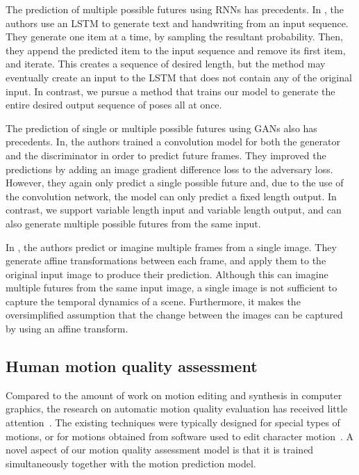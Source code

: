 \documentclass[10pt,twocolumn,letterpaper]{article}
\begin{document}
The prediction of multiple possible futures using RNNs has precedents. In \cite{corr2013:Graves}, the authors use an LSTM\cite{nc1997:Hochreiter} to generate text and handwriting from an input sequence. They generate one item at a time, by sampling the resultant probability. Then, they append the predicted item to the input sequence and remove its first item, and iterate. This creates a sequence of desired length, but the method may eventually create an input to the LSTM that does not contain any of the original input. In contrast, we pursue a method that trains our model to generate the entire desired output sequence of poses all at once.

The prediction of single or multiple possible futures using GANs also has precedents. In\cite{corr2015:Mathieu}, the authors trained a convolution model for both the generator and the discriminator in order to predict future frames. They improved the predictions by adding an image gradient difference loss to the adversary loss.  However, they again only predict a single possible future and, due to the use of the convolution network, the model can only predict a fixed length output. In contrast, we support variable length input and variable length output, and can also generate multiple possible futures from the same input.

In \cite{corr2017:Chen}, the authors predict or imagine multiple frames from a single image. They generate affine transformations between each frame, and apply them to the original input image to produce their prediction. Although this can imagine multiple futures from the same input image, a single image is not sufficient to capture the temporal dynamics of a scene. Furthermore, it makes the oversimplified assumption that the change between the images can be captured by using an affine transform.

\subsection {Human motion quality assessment}

Compared to the amount of work on motion editing and synthesis in computer graphics, the research on automatic motion quality evaluation has received little attention~\cite{tog:Ren2005,tog:Harrison2004,tog:Hodgins1998,tog:Reitsma2003}. The existing techniques were typically designed for special types of motions, or for motions obtained from software used to edit character motion~\cite{cmm:Wang2014}. A novel aspect of our motion quality assessment model is that it is trained simultaneously together with the motion prediction model.
\end{document}
